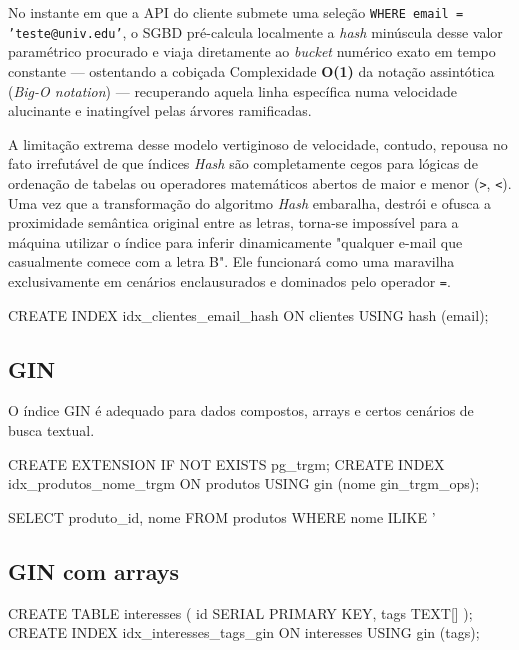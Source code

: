No instante em que a API do cliente submete uma seleção \texttt{WHERE email = 'teste@univ.edu'}, o SGBD pré-calcula localmente a \textit{hash} minúscula desse valor paramétrico procurado e viaja diretamente ao \textit{bucket} numérico exato em tempo constante --- ostentando a cobiçada Complexidade \textbf{O(1)} da notação assintótica (\textit{Big-O notation}) --- recuperando aquela linha específica numa velocidade alucinante e inatingível pelas árvores ramificadas. 

A limitação extrema desse modelo vertiginoso de velocidade, contudo, repousa no fato irrefutável de que índices \textit{Hash} são completamente cegos para lógicas de ordenação de tabelas ou operadores matemáticos abertos de maior e menor (\texttt{>}, \texttt{<}). Uma vez que a transformação do algoritmo \textit{Hash} embaralha, destrói e ofusca a proximidade semântica original entre as letras, torna-se impossível para a máquina utilizar o índice para inferir dinamicamente "qualquer e-mail que casualmente comece com a letra B". Ele funcionará como uma maravilha exclusivamente em cenários enclausurados e dominados pelo operador \texttt{=}.

\begin{sqlcode}
CREATE INDEX idx_clientes_email_hash
ON clientes USING hash (email);
\end{sqlcode}

\subsection{GIN}

O índice GIN é adequado para dados compostos, arrays e certos cenários de busca textual.

\begin{sqlcode}
CREATE EXTENSION IF NOT EXISTS pg_trgm;
CREATE INDEX idx_produtos_nome_trgm
ON produtos USING gin (nome gin_trgm_ops);
\end{sqlcode}

\begin{sqlcode}
SELECT produto_id, nome
FROM produtos
WHERE nome ILIKE '%
\end{sqlcode}

\subsection{GIN com arrays}

\begin{sqlcode}
CREATE TABLE interesses (
    id SERIAL PRIMARY KEY,
    tags TEXT[]
);
CREATE INDEX idx_interesses_tags_gin
ON interesses USING gin (tags);
\end{sqlcode}

